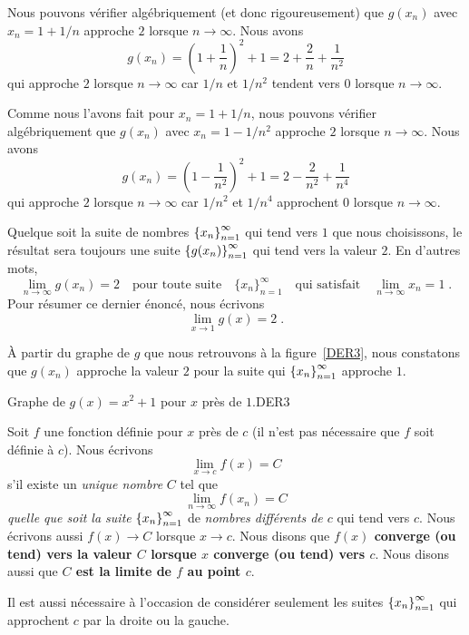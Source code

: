 {\begin{egg}
Nous pouvons vérifier algébriquement (et donc rigoureusement) que
$g(x_n)$ avec $x_n = 1 + 1/n$ approche $2$ lorsque $n \to \infty$.
Nous avons
\[
g(x_n) = \left(1+\frac{1}{n}\right)^2 + 1
= 2 + \frac{2}{n} + \frac{1}{n^2}
\]
qui approche $2$ lorsque $n \to \infty$ car $1/n$ et $1/n^2$ tendent
vers $0$ lorsque $n \to \infty$.

Comme nous l'avons fait pour $x_n = 1 + 1/n$, nous pouvons vérifier
algébriquement que $g(x_n)$ avec $x_n = 1 - 1/n^2$ approche $2$ lorsque
$n \to \infty$.  Nous avons
\[
g(x_n) = \left(1-\frac{1}{n^2}\right)^2 + 1
= 2 - \frac{2}{n^2} + \frac{1}{n^4}
\]
qui approche $2$ lorsque $n \to \infty$ car $1/n^2$
et $1/n^4$ approchent $0$ lorsque $n \to \infty$.

Quelque soit la suite de nombres
$\displaystyle \left\{x_n\right\}_{n=1}^\infty$
qui tend vers $1$ que nous choisissons, le résultat sera toujours une
suite $\displaystyle \left\{g(x_n)\right\}_{n=1}^\infty$ qui tend vers
la valeur $2$.  En d'autres mots,
\[
\lim_{n\rightarrow \infty} g(x_n) = 2 \quad
\text{pour toute suite} \quad \{x_n\}_{n=1}^\infty \quad
\text{qui satisfait} \quad
\lim_{n\rightarrow \infty} x_n = 1 \; .
\]
Pour résumer ce dernier énoncé, nous écrivons
\[
\lim_{x\rightarrow 1} g(x) = 2 \; .
\]

À partir du graphe de $g$ que nous retrouvons à la figure~\ref{DER3},
nous constatons que $g(x_n)$ approche la valeur $2$ pour la suite qui
$\displaystyle \left\{x_n\right\}_{n=1}^\infty$ approche $1$.
\label{egg_cont1}
\end{egg}

{Graphe de $g(x) = x^2 + 1$ pour $x$ près de $1$.}{DER3}

\begin{defn} 
Soit $f$ une fonction définie pour $x$ près de $c$ (il n'est pas
nécessaire que $f$ soit définie à $c$).  Nous écrivons
\[
\lim_{x\rightarrow c} f(x) = C
\]
s'il existe un {\em unique nombre} $C$ tel que
\[
\lim_{n\rightarrow \infty} f(x_n) = C
\]
{\em quelle que soit la suite}
$\displaystyle \left\{x_n\right\}_{n=1}^\infty$ de
{\em nombres différents de $c$} qui tend vers $c$.   Nous écrivons aussi
$f(x) \to C$ lorsque $x \to c$.  Nous disons que
{\bfseries $f(x)$ converge (ou tend) vers la valeur $C$
lorsque $x$ converge (ou tend) vers $c$}.  Nous disons aussi que
{\bfseries $C$ est la limite de $f$ au point $c$}.
\label{def1_conv}
\end{defn}

Il est aussi nécessaire à l'occasion de considérer seulement les suites
$\displaystyle \left\{x_n\right\}_{n=1}^\infty$ qui approchent $c$ par la
droite ou la gauche.

}
